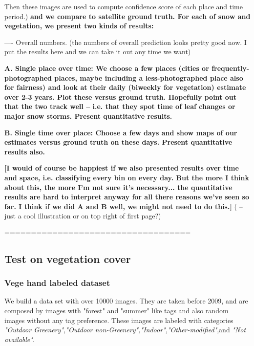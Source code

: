 Then these images are used to compute confidence score of each place and time period.)
\textbf{and we compare to satellite ground truth. For each of snow and vegetation, we present two kinds of results:}

---- Overall numbers.
 (the numbers of overall prediction looks pretty good now. I put the results here and we can take it out any time we want)

\textbf{
A. Single place over time: We choose a few places (cities or frequently-photographed places, maybe including a less-photographed place also for fairness) and look at their daily (biweekly for vegetation) estimate over 2-3 years. Plot these versus ground truth. Hopefully point out that the two track well -- i.e. that they spot time of leaf changes or major snow storms. Present quantitative results.
}

\textbf{
B. Single time over place: Choose a few days and show maps of our estimates versus ground truth on these days. Present quantitative results also.
}

\textbf{
[I would of course be happiest if we also presented results over time and space, i.e. classifying every bin on every day. But the more I think about this, the more I'm not sure it's necessary... the quantitative results are hard to interpret anyway for all there reasons we've seen so far. I think if we did A and B well, we might not need to do this.]
}( -- just a cool illustration or on top right of first page?)

\hfill \break
\hfill \break
===================================
\hfill \break
\hfill \break

\subsection{Test on vegetation cover}
\subsubsection*{Vege hand labeled dataset}

We build a data set with over 10000 images. They are taken before 2009, and are composed by images with "forest" and "summer" like tags and also random images without any tag preference. These images are labeled with categories 
\textit{"Outdoor Greenery","Outdoor non-Greenery","Indoor","Other-modified"},and \textit{"Not available"}.

